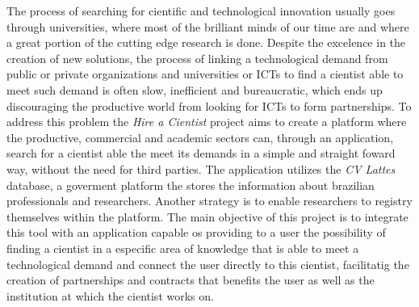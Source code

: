 \begin{abstractutfpr}
    The process of searching for cientific and technological innovation usually goes through universities, where most of the brilliant minds of our time are and where a great portion of the cutting edge research is done. Despite the excelence in the creation of new solutions, the process of linking a technological demand from public or private organizations and universities or ICTs to find a cientist able to meet such demand is often slow, inefficient and bureaucratic, which ends up discouraging the productive world from looking for ICTs to form partnerships. To address this problem the \emph{Hire a Cientist} project aims to create a platform where the productive, commercial and academic sectors can, through an application, search for a cientist able the meet its demands in a simple and straight foward way, without the need for third parties.
    The application utilizes the \emph{CV Lattes} database, a goverment platform the stores the information about brazilian professionals and researchers. Another strategy is to enable researchers to registry themselves within the platform. The main objective of this project is to integrate this tool with an application capable os providing to a user the possibility of finding a cientist in a especific area of knowledge that is able to meet a technological demand and connect the user directly to this cientist, facilitatig the creation of partnerships and contracts that benefits the user as well as the institution at which the cientist works on.
\end{abstractutfpr}

